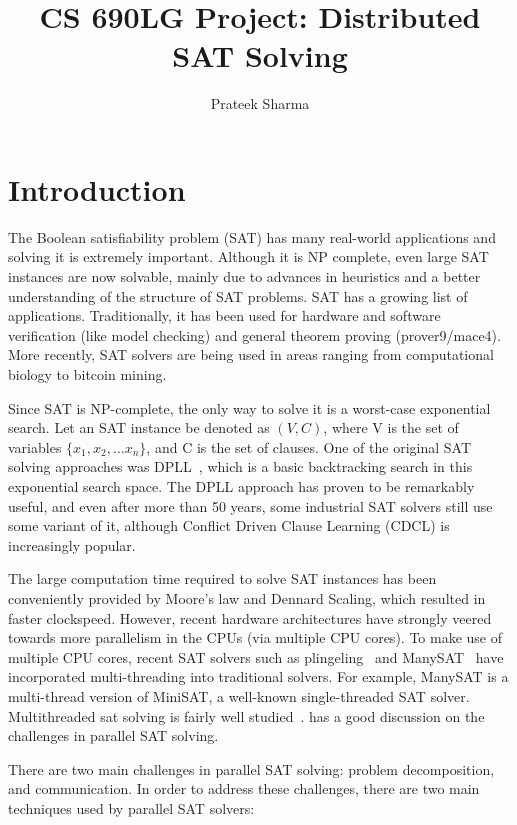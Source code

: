 \documentclass{article}
\title{CS 690LG Project: Distributed SAT Solving}
\author{Prateek Sharma}
\begin{document}
\maketitle
\section{Introduction}

The Boolean satisfiability problem (SAT) has many real-world
applications and solving it is extremely important. Although it is NP
complete, even large SAT instances are now solvable, mainly due to
advances in heuristics and a better understanding of the structure of
SAT problems. SAT has a growing list of applications. Traditionally,
it has been used for hardware and software verification (like model
checking) and general theorem proving (prover9/mace4). More recently,
SAT solvers are being used in areas ranging from computational biology
to bitcoin mining.


Since SAT is NP-complete, the only way to solve it is a worst-case
exponential search. Let an SAT instance be denoted as $(V,C)$, where V
is the set of variables $\{x_1,x_2,\ldots x_n \}$, and C is the set of
clauses. One of the original SAT solving approaches was
DPLL~\cite{knuth}, which is a basic backtracking search in this
exponential search space. The DPLL approach has proven to be
remarkably useful, and even after more than 50 years, some industrial
SAT solvers still use some variant of it, although Conflict Driven
Clause Learning (CDCL) is increasingly popular.


The large computation time required to solve SAT instances has been
conveniently provided by Moore's law and Dennard Scaling, which
resulted in faster clockspeed. However, recent hardware architectures
have strongly veered towards more parallelism in the CPUs (via
multiple CPU cores). To make use of multiple CPU cores, recent SAT
solvers such as plingeling~\cite{plingeling} and
ManySAT~\cite{manysat} have incorporated multi-threading into
traditional solvers. For example, ManySAT is a multi-thread version of
MiniSAT, a well-known single-threaded SAT solver. Multithreaded sat
solving is fairly well
studied~\cite{lewis2007multithreaded}.\cite{hamadi2013seven} has a
good discussion on the challenges in parallel SAT solving.


There are two main challenges in parallel SAT solving: problem
decomposition, and communication. In order to address these
challenges, there are two main techniques used by parallel SAT solvers:
\end{document}
